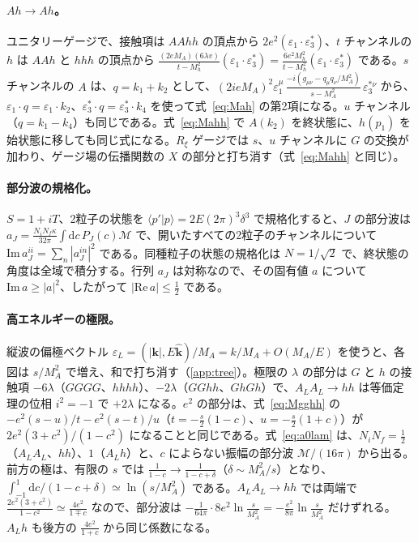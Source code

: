\documentclass[a4paper,10pt]{ltjsarticle}
\newcommand{\dd}{\mathrm{d}}
\newcommand{\re}{\mathrm{Re}\,}
\newcommand{\im}{\mathrm{Im}\,}
\begin{document}
\paragraph{$Ah\to Ah$。}ユニタリーゲージで、接触項は $AAhh$ の頂点から $2e^2(\varepsilon_1\cdot\varepsilon_3^*)$、$t$ チャンネルの $h$ は $AAh$ と $hhh$ の頂点から $\frac{(2eM_A)(6\lambda v)}{t-M_h^2}(\varepsilon_1\cdot\varepsilon_3^*)=\frac{6e^2M_h^2}{t-M_h^2}(\varepsilon_1\cdot\varepsilon_3^*)$ である。$s$ チャンネルの $A$ は、$q=k_1+k_2$ として、$(2ieM_A)^2\varepsilon_1^\mu\,\frac{-i(g_{\mu\nu}-q_\mu q_\nu/M_A^2)}{s-M_A^2}\,\varepsilon_3^{*\nu}$ から、$\varepsilon_1\cdot q=\varepsilon_1\cdot k_2$、$\varepsilon_3^*\cdot q=\varepsilon_3^*\cdot k_4$ を使って式~\eqref{eq:Mah} の第2項になる。$u$ チャンネル（$q=k_1-k_4$）も同じである。式~\eqref{eq:Mahh} で $A(k_2)$ を終状態に、$h(p_1)$ を始状態に移しても同じ式になる。$R_\xi$ ゲージでは $s$、$u$ チャンネルに $G$ の交換が加わり、ゲージ場の伝播関数の $X$ の部分と打ち消す（式~\eqref{eq:Mahh} と同じ）。

\paragraph{部分波の規格化。}$S=1+iT$、2粒子の状態を $\langle p'|p\rangle=2E(2\pi)^3\delta^3$ で規格化すると、$J$ の部分波は $a_J=\frac{N_iN_f\kappa}{32\pi}\int\dd c\,P_J(c)\mathcal M$ で、開いたすべての2粒子のチャンネルについて $\im a_J^{ii}=\sum_n|a_J^{in}|^2$ である。同種粒子の状態の規格化は $N=1/\sqrt2$ で、終状態の角度は全域で積分する。行列 $a_J$ は対称なので、その固有値 $a$ について $\im a\ge|a|^2$、したがって $|\re a|\le\frac12$ である。

\paragraph{高エネルギーの極限。}縦波の偏極ベクトル $\varepsilon_L=(|\boldsymbol k|,E\hat{\boldsymbol k})/M_A=k/M_A+O(M_A/E)$ を使うと、各図は $s/M_A^2$ で増え、和で打ち消す（\ref{app:tree}）。極限の $\lambda$ の部分は $G$ と $h$ の接触項 $-6\lambda$（$GGGG$、$hhhh$）、$-2\lambda$（$GGhh$、$GhGh$）で、$A_LA_L\to hh$ は等価定理の位相 $i^2=-1$ で $+2\lambda$ になる。$e^2$ の部分は、式~\eqref{eq:Mgghh} の $-e^2(s-u)/t-e^2(s-t)/u$（$t=-\frac s2(1-c)$、$u=-\frac s2(1+c)$）が $2e^2(3+c^2)/(1-c^2)$ になることと同じである。式~\eqref{eq:a0lam} は、$N_iN_f=\frac12$（$A_LA_L$、$hh$）、$1$（$A_Lh$）と、$c$ によらない振幅の部分波 $\mathcal M/(16\pi)$ から出る。前方の極は、有限の $s$ では $\frac1{1-c}\to\frac1{1-c+\delta}$（$\delta\sim M_A^2/s$）となり、$\int_{-1}^1\dd c/(1-c+\delta)\simeq\ln(s/M_A^2)$ である。$A_LA_L\to hh$ では両端で $\frac{2e^2(3+c^2)}{1-c^2}\simeq\frac{4e^2}{1\mp c}$ なので、部分波は $-\frac{1}{64\pi}\cdot8e^2\ln\frac s{M_A^2}=-\frac{e^2}{8\pi}\ln\frac s{M_A^2}$ だけずれる。$A_Lh$ も後方の $\frac{4e^2}{1+c}$ から同じ係数になる。
\end{document}

